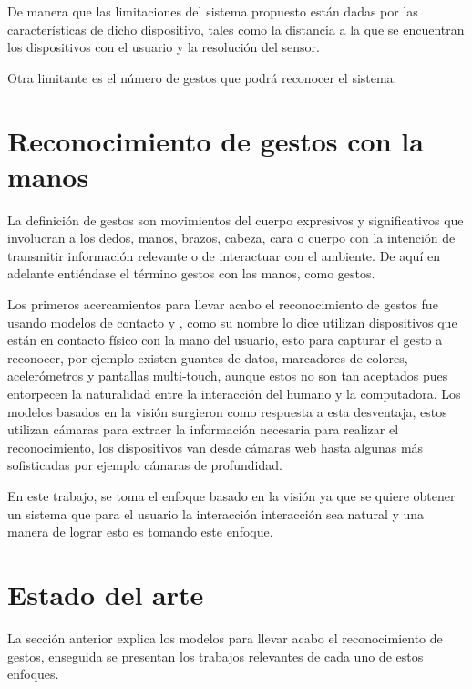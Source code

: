 De  manera que las limitaciones del sistema propuesto están dadas por las características de dicho dispositivo, tales como la distancia  a la que se encuentran los dispositivos con el usuario y la resolución del sensor. 

Otra limitante es el número de gestos que podrá reconocer el sistema.



\section{Reconocimiento de gestos con la manos}\label{sec:ReconocimientoGestos} 

La definición de gestos \citep{Mitra2007} son movimientos del cuerpo expresivos y significativos que involucran a los dedos, manos, brazos, cabeza, cara o cuerpo con la intención de transmitir información relevante o de interactuar con el ambiente. De aquí en adelante entiéndase el término gestos con las manos, como gestos. 

Los primeros acercamientos para llevar acabo el reconocimiento de gestos fue usando modelos de contacto \citep{Rautaray2012} y \citep{Nayakwadi2014}, como su nombre lo dice utilizan dispositivos que est\'an en contacto f\'isico con la mano del usuario, esto para capturar el gesto a reconocer, por ejemplo existen guantes de datos, marcadores de colores, acelerómetros y pantallas multi-touch, aunque estos no son tan aceptados pues entorpecen la naturalidad entre la interacción del humano y la computadora. Los modelos basados en la visión surgieron como respuesta a esta desventaja, estos utilizan cámaras para extraer la información necesaria para realizar el reconocimiento, los dispositivos van desde cámaras web hasta algunas más sofisticadas por ejemplo c\'amaras de profundidad.  

En este trabajo, se toma el enfoque basado en la visión ya que se quiere obtener un sistema que para el usuario la interacción interacción sea natural y una manera de lograr esto es tomando este enfoque.  



\section{Estado del arte}\label{sec:EstadoDelArte} 

La sección anterior explica los modelos para llevar acabo el reconocimiento de gestos, enseguida se presentan los trabajos relevantes de cada uno de estos enfoques. 

